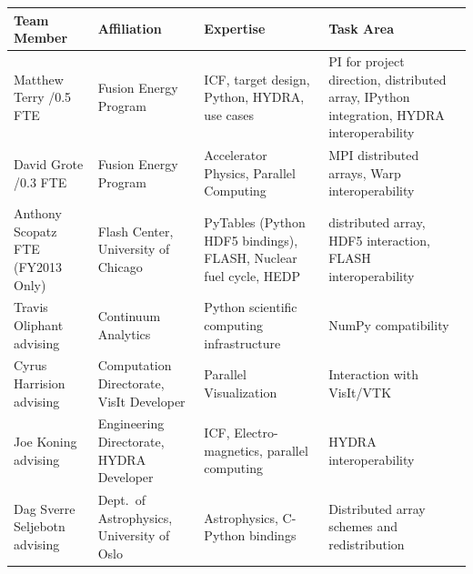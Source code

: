 \documentclass[letterpaper,11pt]{article}
\newlength{\DUtablewidth} %
\begin{document}
\setlength{\DUtablewidth}{\linewidth}
\begin{longtable*}[c]
	{|p{0.187\DUtablewidth}|p{0.251\DUtablewidth}|p{0.260\DUtablewidth}|p{0.251\DUtablewidth}|}
	\hline
	\textbf{Team Member} & \textbf{Affiliation} & \textbf{Expertise} & \textbf{Task Area} \\
	\endfirsthead
	\hline

	Matthew Terry /0.5 FTE &
	Fusion Energy Program &
	ICF, target design, Python, HYDRA, use cases &
	PI for project direction,
	distributed array, IPython integration, HYDRA interoperability \\
	\hline

	David Grote /0.3 FTE &
	Fusion Energy Program &
	Accelerator Physics, Parallel Computing &
	MPI distributed arrays, Warp interoperability \\
	\hline

	Anthony Scopatz  FTE (FY2013 Only) &
	Flash Center, \newline
	University of Chicago &
	PyTables (Python HDF5 bindings), FLASH, Nuclear fuel cycle, HEDP &
	distributed array, HDF5 interaction, FLASH interoperability \\
	\hline

	Travis Oliphant \newline
	advising &
	Continuum Analytics &
	Python scientific computing infrastructure &
	NumPy compatibility \\
	\hline

	Cyrus Harrision \newline
	advising &
	Computation Directorate, \newline
	VisIt Developer &
	Parallel Visualization &
	Interaction with VisIt/VTK  \\
	\hline

	Joe Koning \newline
	advising &
	Engineering Directorate, \newline
	HYDRA Developer & 
	ICF, Electro-magnetics, parallel computing & 
	HYDRA interoperability \\
	\hline

	Dag Sverre Seljebotn \newline
	advising &
	Dept.\ of Astrophysics, \newline
	University of Oslo &
	Astrophysics, C-Python bindings &
	Distributed array schemes and redistribution \\
	\hline
\end{longtable*}

\newpage



\end{document}
